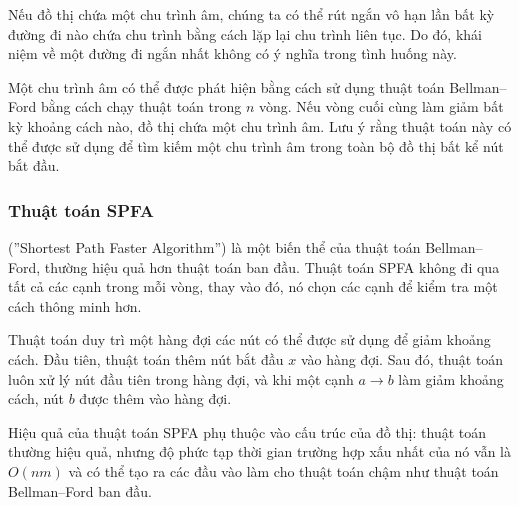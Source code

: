 Nếu đồ thị chứa một chu trình âm,
chúng ta có thể rút ngắn vô hạn lần
bất kỳ đường đi nào chứa chu trình bằng cách lặp lại chu trình
liên tục.
Do đó, khái niệm về một đường đi ngắn nhất
không có ý nghĩa trong tình huống này.

Một chu trình âm có thể được phát hiện
bằng cách sử dụng thuật toán Bellman–Ford bằng cách
chạy thuật toán trong $n$ vòng.
Nếu vòng cuối cùng làm giảm bất kỳ khoảng cách nào,
đồ thị chứa một chu trình âm.
Lưu ý rằng thuật toán này có thể được sử dụng để
tìm kiếm
một chu trình âm trong toàn bộ đồ thị
bất kể nút bắt đầu.

\subsubsection{Thuật toán SPFA}


 (''Shortest Path Faster Algorithm'') \cite{fan94}
là một biến thể của thuật toán Bellman–Ford,
thường hiệu quả hơn thuật toán ban đầu.
Thuật toán SPFA không đi qua tất cả các cạnh trong mỗi vòng,
thay vào đó, nó chọn các cạnh để kiểm tra
một cách thông minh hơn.

Thuật toán duy trì một hàng đợi các nút có thể
được sử dụng để giảm khoảng cách.
Đầu tiên, thuật toán thêm nút bắt đầu $x$
vào hàng đợi.
Sau đó, thuật toán luôn xử lý
nút đầu tiên trong hàng đợi, và khi một cạnh
$a \rightarrow b$ làm giảm khoảng cách,
nút $b$ được thêm vào hàng đợi.
% 
% 

Hiệu quả của thuật toán SPFA phụ thuộc
vào cấu trúc của đồ thị:
thuật toán thường hiệu quả,
nhưng độ phức tạp thời gian trường hợp xấu nhất của nó vẫn là
$O(nm)$ và có thể tạo ra các đầu vào
làm cho thuật toán chậm như
thuật toán Bellman–Ford ban đầu.

